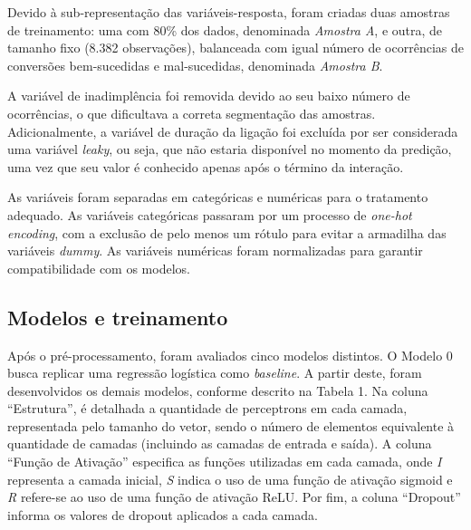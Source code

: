 \documentclass[
  onecolumn]{article}
\begin{document}
Devido à sub-representação das variáveis-resposta, foram criadas duas
amostras de treinamento: uma com 80\% dos dados, denominada
\emph{Amostra A}, e outra, de tamanho fixo (8.382 observações),
balanceada com igual número de ocorrências de conversões bem-sucedidas e
mal-sucedidas, denominada \emph{Amostra B}.

A variável de inadimplência foi removida devido ao seu baixo número de
ocorrências, o que dificultava a correta segmentação das amostras.
Adicionalmente, a variável de duração da ligação foi excluída por ser
considerada uma variável \emph{leaky}, ou seja, que não estaria
disponível no momento da predição, uma vez que seu valor é conhecido
apenas após o término da interação.

As variáveis foram separadas em categóricas e numéricas para o
tratamento adequado. As variáveis categóricas passaram por um processo
de \emph{one-hot encoding}, com a exclusão de pelo menos um rótulo para
evitar a armadilha das variáveis \emph{dummy}. As variáveis numéricas
foram normalizadas para garantir compatibilidade com os modelos.

\subsection{Modelos e treinamento}\label{modelos-e-treinamento}

Após o pré-processamento, foram avaliados cinco modelos distintos. O
Modelo 0 busca replicar uma regressão logística como \emph{baseline}. A
partir deste, foram desenvolvidos os demais modelos, conforme descrito
na Tabela 1. Na coluna ``Estrutura'', é detalhada a quantidade de
perceptrons em cada camada, representada pelo tamanho do vetor, sendo o
número de elementos equivalente à quantidade de camadas (incluindo as
camadas de entrada e saída). A coluna ``Função de Ativação'' especifica
as funções utilizadas em cada camada, onde \emph{I} representa a camada
inicial, \emph{S} indica o uso de uma função de ativação sigmoid e
\emph{R} refere-se ao uso de uma função de ativação ReLU. Por fim, a
coluna ``Dropout'' informa os valores de dropout aplicados a cada
camada.
\end{document}
